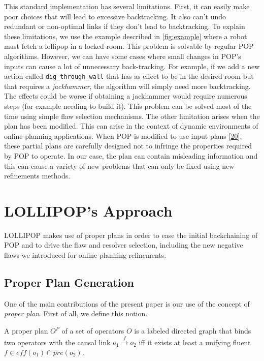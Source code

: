 This standard implementation has several limitations. First, it can
easily make poor choices that will lead to excessive backtracking. It
also can't undo redundant or non-optimal links if they don't lead to
backtracking. To explain these limitations, we use the example described
in \cref{fig:example} where a robot must fetch a lollipop in a locked
room. This problem is solvable by regular POP algorithms. However, we
can have some cases where small changes in POP's inputs can cause a lot
of unnecessary back-tracking. For example, if we add a new action called
\lstinline!dig_through_wall! that has as effect to be in the desired
room but that requires a \emph{jackhammer}, the algorithm will simply
need more backtracking. The effects could be worse if obtaining a
jackhammer would require numerous steps (for example needing to build
it). This problem can be solved most of the time using simple flaw
selection mechanisms. The other limitation arises when the plan has been
modified. This can arise in the context of dynamic environments of
online planning applications. When POP is modified to use input plans
{[}\protect\hyperlink{ref-sebastiaux5fgraph-basedux5f2000}{20}{]}, these
partial plans are carefully designed not to infringe the properties
required by POP to operate. In our case, the plan can contain misleading
information and this can cause a variety of new problems that can only
be fixed using new refinements methods.

\section{LOLLIPOP's Approach}\label{lollipops-approach}

LOLLIPOP makes use of proper plans in order to ease the initial
backchaining of POP and to drive the flaw and resolver selection,
including the new negative flaws we introduced for online planning
refinements.

\subsection{Proper Plan Generation}\label{sec:properplan}

One of the main contributions of the present paper is our use of the
concept of \emph{proper plan}. First of all, we define this notion.

\begin{definition}

A proper plan \(O^P\) of a set of operators \(O\) is a labeled directed
graph that binds two operators with the causal link
\(o_1 \xrightarrow{f} o_2\) iff it exists at least a unifying fluent
\(f \in eff(o_1) \cap pre(o_2)\).

\end{definition}

